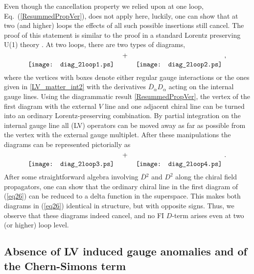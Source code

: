 \documentclass[12pt]{revtex4}
\begin{document}
Even though the cancellation
property we relied upon at one loop, Eq.\ (\ref{ResummedPropVer}), does
not apply here,  luckily, one can show that at two (and higher) loops
the effects of all such possible insertions still cancel. The proof of
this statement is similar to the proof in a standard Lorentz
preserving U(1) theory \cite{Fischler:1981zk}. At two loops, there are
two types of diagrams, 
%
\begin{equation}
\raisebox{-3ex}{\texttt{[image: diag\_2loop1.ps]}}
\quad + \quad 
\raisebox{-3ex}{\texttt{[image: diag\_2loop2.ps]}}
~,
\end{equation} 
%
where the vertices with boxes denote either regular gauge interactions or
the ones given in \eqref{LV_matter_int2} with the derivatives
$\overline{D}_{\dot\alpha} D_\alpha$ acting on the internal gauge lines. 
Using the diagrammatic result \eqref{ResummedPropVer}, the vertex of 
the first diagram with the external $V$ line and one adjacent chiral
line can be turned into an ordinary Lorentz-preserving combination. 
By partial integration on
the internal gauge line all (LV) operators can be moved away as far as
possible from the vertex with the external gauge multiplet. After
these manipulations the diagrams can be represented pictorially as  
%
\begin{equation}
\raisebox{-3ex}{\texttt{[image: diag\_2loop3.ps]}}
\quad + \quad 
\raisebox{-3ex}{\texttt{[image: diag\_2loop4.ps]}}
~.
\label{eq26}
\end{equation} 
%
After some straightforward algebra involving $\overline{D}{}^2$ and 
$D^2$ along the chiral field propagators, one can show that 
the ordinary chiral line in the first diagram of (\ref{eq26}) 
can be reduced to a delta function in the superspace.
This makes both diagrams in (\ref{eq26}) identical in structure, but
with opposite signs. Thus, we observe that these diagrams indeed
cancel, and no FI $D$-term arises even at two (or higher) loop level.  


\subsection{Absence of LV induced gauge anomalies and of the Chern-Simons term}
\label{noAnomaly}
\end{document}
